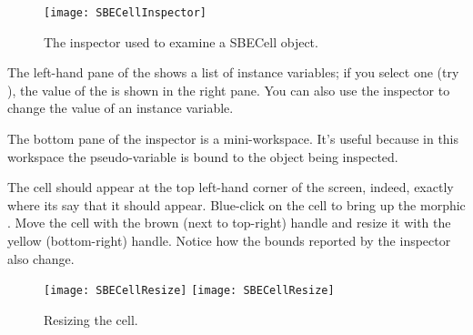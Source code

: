 \documentclass[a4paper,10pt,twoside]{book}
\begin{document}
\begin{figure}[htbp]
   \centering
   \texttt{[image: SBECellInspector]} 
   \caption{The inspector used to examine a SBECell object.\label{fig:SBECellInspector}}
\end{figure}

The left-hand pane of the  shows a list of instance variables; if you select one (try \mbox{),} the value of the  is shown in the right pane.
You can also use the inspector to change the value of an instance variable.


The bottom pane of the inspector is a mini-workspace.
It's useful because in this workspace the pseudo-variable \self is bound to the object being inspected. 

The cell should appear at the top left-hand corner of the screen, indeed, exactly where its  say that it should appear.
Blue-click on the cell to bring up the morphic .
Move the cell with the brown (next to top-right) handle and resize it with the yellow (bottom-right) handle.
Notice how the bounds reported by the inspector also change.

\begin{figure}[htbp]
\centering
\ifluluelse
	{\texttt{[image: SBECellResize]} }
	{\texttt{[image: SBECellResize]} }
\caption{Resizing the cell.\label{fig:cellresize}}
\end{figure}
\end{document}

